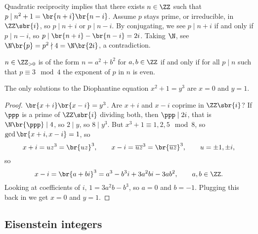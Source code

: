 
Quadratic reciprocity implies that there exists $ n \in \ZZ $ such that $ p \mid n^2 + 1 = \br{n + i}\br{n - i} $. Assume $ p $ stays prime, or irreducible, in $ \ZZ\sbr{i} $, so $ p \mid n + i $ or $ p \mid n - i $. By conjugating, we see $ p \mid n + i $ if and only if $ p \mid n - i $, so $ p \mid \br{n + i} - \br{n - i} = 2i $. Taking $ \N $, see $ \N\br{p} = p^2 \nmid 4 = \N\br{2i} $, a contradiction.

\begin{theorem}
$ n \in \ZZ_{> 0} $ is of the form $ n = a^2 + b^2 $ for $ a, b \in \ZZ $ if and only if for all $ p \mid n $ such that $ p \equiv 3 \mod 4 $ the exponent of $ p $ in $ n $ is even.
\end{theorem}

\pagebreak

\begin{theorem}
The only solutions to the Diophantine equation $ x^2 + 1 = y^3 $ are $ x = 0 $ and $ y = 1 $.
\end{theorem}

\begin{proof}
$ \br{x + i}\br{x - i} = y^3 $. Are $ x + i $ and $ x - i $ coprime in $ \ZZ\sbr{i} $? If $ \ppp $ is a prime of $ \ZZ\sbr{i} $ dividing both, then $ \ppp \mid 2i $, that is $ \N\br{\ppp} \mid 4 $, so $ 2 \mid y $, so $ 8 \mid y^3 $. But $ x^3 + 1 \equiv 1, 2, 5 \mod 8 $, so $ \gcd\br{x + i, x - i} = 1 $, so
$$ x + i = uz^3 = \br{uz}^3, \qquad x - i = \overline{u}\overline{z}^3 = \br{\overline{u}\overline{z}}^3, \qquad u = \pm 1, \pm i, $$
so
$$ x - i = \br{a + bi}^3 = a^3 - b^3i + 3a^2bi - 3ab^2, \qquad a, b \in \ZZ. $$
Looking at coefficients of $ i $, $ 1 = 3a^2b - b^3 $, so $ a = 0 $ and $ b = -1 $. Plugging this back in we get $ x = 0 $ and $ y = 1 $.
\end{proof}

\subsection{Eisenstein integers}

